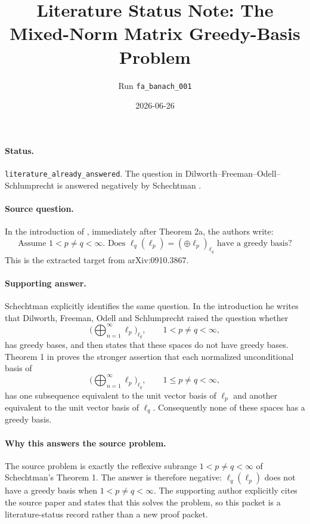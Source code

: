 \documentclass[11pt]{article}
\title{Literature Status Note: The Mixed-Norm Matrix Greedy-Basis Problem}
\author{Run \texttt{fa\_banach\_001}}
\date{2026-06-26}
\begin{document}
\maketitle

\paragraph{Status.}
\texttt{literature\_already\_answered}.  The question in
Dilworth--Freeman--Odell--Schlumprecht \cite{DFOS} is answered negatively by
Schechtman \cite{Schechtman}.

\paragraph{Source question.}
In the introduction of \cite{DFOS}, immediately after Theorem 2a, the authors
write:
\[
  \text{Assume } 1<p\ne q<\infty. \text{ Does }
  \ell_q(\ell_p)=(\oplus \ell_p)_{\ell_q}
  \text{ have a greedy basis?}
\]
This is the extracted target from arXiv:0910.3867.

\paragraph{Supporting answer.}
Schechtman \cite{Schechtman} explicitly identifies the same question.  In the
introduction he writes that Dilworth, Freeman, Odell and Schlumprecht raised
the question whether
\[
  \Big(\bigoplus_{n=1}^{\infty} \ell_p\Big)_{\ell_q},
  \qquad 1<p\ne q<\infty,
\]
has greedy bases, and then states that these spaces do not have greedy bases.
Theorem 1 in \cite{Schechtman} proves the stronger assertion that each
normalized unconditional basis of
\[
  \Big(\bigoplus_{n=1}^{\infty} \ell_p\Big)_{\ell_q},
  \qquad 1\le p\ne q<\infty,
\]
has one subsequence equivalent to the unit vector basis of $\ell_p$ and another
equivalent to the unit vector basis of $\ell_q$. Consequently none of these
spaces has a greedy basis.

\paragraph{Why this answers the source problem.}
The source problem is exactly the reflexive subrange
$1<p\ne q<\infty$ of Schechtman's Theorem 1.  The answer is therefore negative:
$\ell_q(\ell_p)$ does not have a greedy basis when $1<p\ne q<\infty$.
The supporting author explicitly cites the source paper and states that this
solves the problem, so this packet is a literature-status record rather than a
new proof packet.
\end{document}
